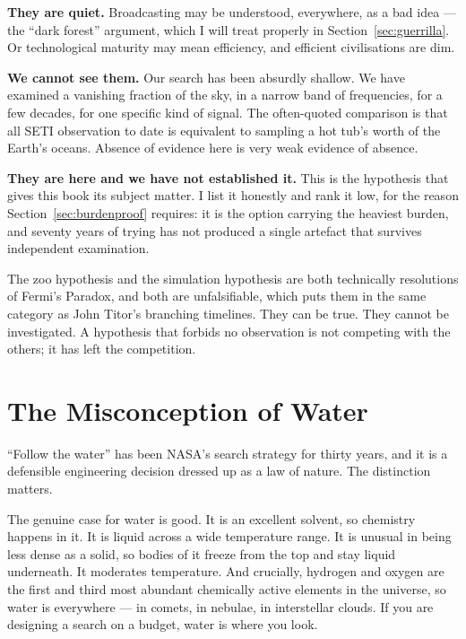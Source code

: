 \textbf{They are quiet.} Broadcasting may be understood, everywhere, as a bad idea ---
the ``dark forest'' argument, which I will treat properly in Section~\ref{sec:guerrilla}.
Or technological maturity may mean efficiency, and efficient civilisations are dim.

\textbf{We cannot see them.} Our search has been absurdly shallow. We have examined a
vanishing fraction of the sky, in a narrow band of frequencies, for a few decades, for one
specific kind of signal. The often-quoted comparison is that all SETI observation to date is
equivalent to sampling a hot tub's worth of the Earth's oceans. Absence of evidence here is
very weak evidence of absence.

\textbf{They are here and we have not established it.} This is the hypothesis that gives this
book its subject matter. I list it honestly and rank it low, for the reason Section~\ref{sec:burdenproof}
requires: it is the option carrying the heaviest burden, and seventy years of trying has not
produced a single artefact that survives independent examination.

\begin{funfact}
The zoo hypothesis and the simulation hypothesis are both technically resolutions of Fermi's
Paradox, and both are unfalsifiable, which puts them in the same category as John Titor's
branching timelines. They can be true. They cannot be investigated. A hypothesis that
forbids no observation is not competing with the others; it has left the competition.
\end{funfact}

\section{The Misconception of Water}\label{sec:water}

``Follow the water'' has been NASA's search strategy for thirty years, and it is a defensible
engineering decision dressed up as a law of nature. The distinction matters.

The genuine case for water is good. It is an excellent solvent, so chemistry happens in it. It
is liquid across a wide temperature range. It is unusual in being less dense as a solid, so
bodies of it freeze from the top and stay liquid underneath. It moderates temperature. And
crucially, hydrogen and oxygen are the first and third most abundant chemically active
elements in the universe, so water is everywhere --- in comets, in nebulae, in interstellar
clouds. If you are designing a search on a budget, water is where you look.

